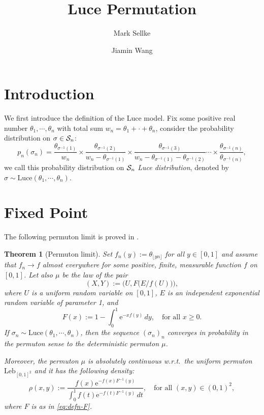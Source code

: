 \documentclass[10pt]{article}
\title{
Luce Permutation
}
\author{Mark Sellke \and Jiamin Wang}
\newcommand{\Leb}{\mathrm{Leb}}
\newcommand{\Luce}{\mathrm{Luce}}
\newtheorem{thm}{Theorem}[section]
\numberwithin{equation}{section}
\begin{document}
	\maketitle  

\section{Introduction}

    We first introduce the definition of the Luce model.
    Fix some positive real number $\theta_1,\cdots,\theta_n$ with total sum $w_n=\theta_1+\cdot+\theta_n$, consider the probability distribution on $\sigma\in {\mathcal S}_n$:
    \begin{equation}\label{def:luce}
        p_n(\sigma_n) = \frac{\theta_{\sigma^{-1}(1)}}{w_n}\times\frac{\theta_{\sigma^{-1}(2)}}{w_n-\theta_{\sigma^{-1}(1)}}\times \frac{\theta_{\sigma^{-1}(3)}}{w_n-\theta_{\sigma^{-1}(1)}-\theta_{\sigma^{-1}(2)}} \cdots \times \frac{\theta_{\sigma^{-1}(n)}}{\theta_{\sigma^{-1}(n)}},
    \end{equation}
    we call this probability distribution on ${\mathcal S}_n$ \emph{Luce distribution}, denoted by $\sigma\sim \Luce(\theta_1,\cdots,\theta_n)$.

\section{Fixed Point}

    The following permuton limit is proved in \cite{borga2025permutonlocallimitsluce}.
    \begin{thm}[Permuton limit]\label{thm:permuton_conv}
	Set $f_n(y):=\theta_{\lfloor yn \rfloor}$ for all $y\in[0,1]$ and assume that $f_n\to f$ almost everywhere for some positive, finite, measurable function $f$ on $[0,1]$.
	Let also $\mu$ be the law of the pair
	\begin{equation}\label{eq:limiting_rv}
            (X,Y):=\Big(U,F\big(E/f(U)\big)\Big),
        \end{equation}
	where $U$ is a uniform random variable on $[0,1]$, $E$ is an independent exponential random variable of parameter 1, and
	\begin{equation}\label{eq:defn-F}
		F(x):=1-\int_0^1\mathrm{e}^{-x f(y)}\,d y,\quad \text{for all $x\geq 0$.}
	\end{equation}
	If $\sigma_n\sim \Luce(\theta_1,\cdots,\theta_n)$, then the sequence $(\sigma_n)_n$ converges in probability in the permuton sense to the deterministic permuton $\mu$. 
    
    Moreover, the permuton $\mu$ is absolutely continuous w.r.t.\ the uniform permuton $\Leb_{[0,1]^2}$ and it has the following density:
	\begin{equation}\label{eq:density}
		\rho(x,y):=	\frac{f(x)\mathrm{e}^{-f(x)F^{-1}(y)}}{\int_0^1f(t)\mathrm{e}^{-f(t)F^{-1}(y)}\,d t}, \quad\text{for all $(x,y)\in(0,1)^2$},
	\end{equation}
    where $F$ is as in \eqref{eq:defn-F}.
    \end{thm}
\end{document}

